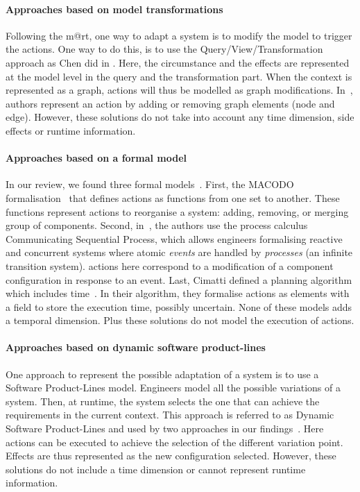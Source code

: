 \paragraph{Approaches based on model transformations}
Following the \gls{m@rt}, one way to adapt a system is to modify the model to trigger the actions.
One way to do this, is to use the Query/View/Transformation~\cite{QVT:Spec} approach as Chen \etal did in \cite{DBLP:conf/icse/ChenPYNZ14}.
Here, the \gls{circumstance} and the effects are represented at the model level in the query and the transformation part.
When the context is represented as a graph, \glspl{action} will thus be modelled as graph modifications.
In~\cite{DBLP:journals/tse/KramerM90}, authors represent an action by adding or removing graph elements (node and edge).
However, these solutions do not take into account any time dimension, side effects or runtime information.
	
\paragraph{Approaches based on a formal model}
In our review, we found three formal models~\cite{DBLP:journals/taas/WeynsHH10, DBLP:conf/icse/BartelsK11, DBLP:conf/aaai/CimattiMR15}.
First, the MACODO formalisation~\cite{DBLP:journals/taas/WeynsHH10} that defines actions as functions from one set to another.
These functions represent actions to reorganise a system: adding, removing, or merging group of components.
Second, in~\cite{DBLP:conf/icse/BartelsK11}, the authors use the process calculus Communicating Sequential Process, which allows engineers formalising reactive and concurrent systems where atomic \textit{events} are handled by \textit{processes} (an infinite transition system).
\Glspl{action} here correspond to a modification of a component configuration in response to an event.
Last, Cimatti \etal defined a planning algorithm which includes time~\cite{DBLP:conf/aaai/CimattiMR15}.
In their algorithm, they formalise \glspl{action} as elements with a field to store the execution time, possibly uncertain.
None of these models adds a temporal dimension.
Plus these solutions do not model the execution of \glspl{action}.

\paragraph{Approaches based on dynamic software product-lines}
One approach to represent the possible adaptation of a system is to use a Software Product-Lines model.
Engineers model all the possible variations of a system.
Then, at runtime, the system selects the one that can achieve the requirements in the current context.
This approach is referred to as Dynamic Software Product-Lines and used by two approaches in our findings~\cite{DBLP:conf/dagstuhl/GhezziS10, DBLP:series/lncs/CordyCHLS13}.
Here \glspl{action} can be executed to achieve the selection of the different variation point.
Effects are thus represented as the new configuration selected.
However, these solutions do not include a time dimension or cannot represent runtime information.


